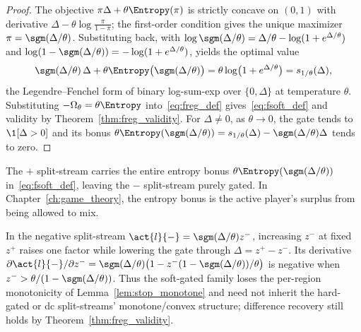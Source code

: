 \begin{proof}
The objective $\pi \Delta + \theta \Entropy(\pi)$ is strictly concave on $(0,1)$ with derivative $\Delta - \theta \log\frac{\pi}{1-\pi}$; the first-order condition gives the unique maximizer $\pi = \sgm(\Delta/\theta)$. Substituting back, with $\log \sgm(\Delta/\theta) = \Delta/\theta - \log(1 + e^{\Delta/\theta})$ and $\log(1 - \sgm(\Delta/\theta)) = -\log(1 + e^{\Delta/\theta})$, yields the optimal value
\begin{equation}
	\sgm(\Delta/\theta)\, \Delta + \theta \Entropy\bigl(\sgm(\Delta/\theta)\bigr) = \theta \log\bigl( 1 + e^{\Delta/\theta} \bigr) = s_{1/\theta}(\Delta),
	\label{eq:legendre_fenchel_softplus}
\end{equation}
the Legendre--Fenchel form of binary log-sum-exp over $\{0,\Delta\}$ at temperature $\theta$. Substituting $-\Omega_\theta=\theta \Entropy$ into~\eqref{eq:freg_def} gives~\eqref{eq:fsoft_def} and validity by Theorem~\ref{thm:freg_validity}. For $\Delta\neq0$, as $\theta\to0$, the gate tends to $\1[\Delta>0]$ and its bonus $\theta \Entropy(\sgm(\Delta/\theta))=s_{1/\theta}(\Delta)-\sgm(\Delta/\theta)\Delta$ tends to zero.
\end{proof}

The $+$ split-stream carries the entire entropy bonus $\theta \Entropy(\sgm(\Delta/\theta))$ in~\eqref{eq:fsoft_def}, leaving the $-$ split-stream purely gated. In Chapter~\ref{ch:game_theory}, the entropy bonus is the active player's surplus from being allowed to mix.

\begin{remark}\label{rem:soft-monotone}
In the negative split-stream $\act{l}{-}=\sgm(\Delta/\theta)z^-$, increasing $z^-$ at fixed $z^+$ raises one factor while lowering the gate through $\Delta=z^+-z^-$. Its derivative $\partial\act{l}{-}/\partial z^- = \sgm(\Delta/\theta)\bigl(1-z^-(1-\sgm(\Delta/\theta))/\theta\bigr)$ is negative when $z^->\theta/(1-\sgm(\Delta/\theta))$. Thus the soft-gated family loses the per-region monotonicity of Lemma~\ref{lem:stop_monotone} and need not inherit the hard-gated or \ac{dc} split-streams' monotone/convex structure; difference recovery still holds by Theorem~\ref{thm:freg_validity}.
\end{remark}

